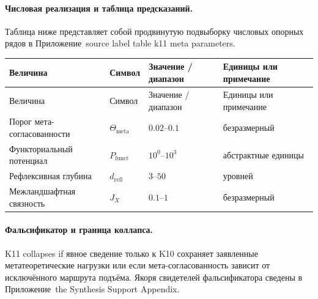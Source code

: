\paragraph{Числовая реализация и таблица предсказаний.}
Таблица ниже представляет собой продвинутую подвыборку числовых опорных рядов в Приложение~source label table k11 meta parameters.
\begin{longtable}{@{}L{0.27\textwidth}L{0.15\textwidth}L{0.24\textwidth}L{0.16\textwidth}@{}}
\toprule
Величина & Символ & Значение / диапазон & Единицы или примечание \\
\midrule
\endfirsthead
\toprule
Величина & Символ & Значение / диапазон & Единицы или примечание \\
\midrule
\endhead
Порог мета-согласованности & $\scriptstyle \Theta_{\mathrm{meta}}$ & $0.02\text{--}0.1$ & безразмерный \\
Функториальный потенциал & $\scriptstyle P_{\mathrm{funct}}$ & $10^0\text{--}10^3$ & абстрактные единицы \\
Рефлексивная глубина & $\scriptstyle d_{\mathrm{refl}}$ & $3\text{--}50$ & уровней \\
Межландшафтная связность & $\scriptstyle J_X$ & $0.1\text{--}1$ & безразмерный \\
\bottomrule
\end{longtable}

\paragraph{Фальсификатор и граница коллапса.}
K11 collapses if явное сведение только к K10 сохраняет заявленные метатеоретические нагрузки или если мета-согласованность зависит от исключённого маршрута подъёма.
Якоря свидетелей фальсификатора сведены в Приложение~the Synthesis Support Appendix.


